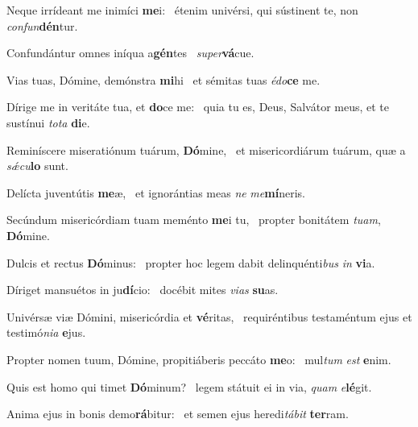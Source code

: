 \item Neque irrídeant me inimíci \textbf{me}i:~\psstar{} étenim univérsi, qui sústinent te, non \textit{con}\textit{fun}\textbf{dén}tur.

\item Confundántur omnes iníqua a\textbf{gén}tes~\psstar{} \textit{su}\textit{per}\textbf{vá}cue.

\item Vias tuas, Dómine, demónstra \textbf{mi}hi~\psstar{} et sémitas tuas \textit{é}\textit{do}\textbf{ce} me.

\item Dírige me in veritáte tua, et \textbf{do}ce me:~\psstar{} quia tu es, Deus, Salvátor meus, et te sustínui \textit{to}\textit{ta} \textbf{di}e.

\item Reminíscere miseratiónum tuárum, \textbf{Dó}mine,~\psstar{} et misericordiárum tuárum, quæ a \textit{sǽ}\textit{cu}\textbf{lo} sunt.

\item Delícta juventútis \textbf{me}æ,~\psstar{} et ignorántias meas \textit{ne} \textit{me}\textbf{mí}neris.

\item Secúndum misericórdiam tuam meménto \textbf{me}i tu,~\psstar{} propter bonitátem \textit{tu}\textit{am}, \textbf{Dó}mine.

\item Dulcis et rectus \textbf{Dó}minus:~\psstar{} propter hoc legem dabit delinquénti\textit{bus} \textit{in} \textbf{vi}a.

\item Díriget mansuétos in ju\textbf{dí}cio:~\psstar{} docébit mites \textit{vi}\textit{as} \textbf{su}as.

\item Univérsæ viæ Dómini, misericórdia et \textbf{vé}ritas,~\psstar{} requiréntibus testaméntum ejus et testimó\textit{ni}\textit{a} \textbf{e}jus.

\item Propter nomen tuum, Dómine, propitiáberis peccáto \textbf{me}o:~\psstar{} mul\textit{tum} \textit{est} \textbf{e}nim.

\item Quis est homo qui timet \textbf{Dó}minum?~\psstar{} legem státuit ei in via, \textit{quam} \textit{e}\textbf{lé}git.

\item Anima ejus in bonis demo\textbf{rá}bitur:~\psstar{} et semen ejus heredi\textit{tá}\textit{bit} \textbf{ter}ram.

